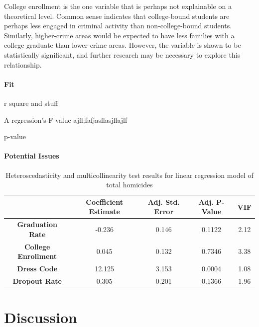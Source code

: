 \documentclass[12pt]{article}
\begin{document}
	\par
	
	College enrollment is the one variable that is perhaps not explainable on a theoretical level.  Common sense indicates that college-bound students are perhaps less engaged in criminal activity than non-college-bound students.  Similarly, higher-crime areas would be expected to have less families with a college graduate than lower-crime areas.  However, the variable is shown to be statistically significant, and further research may be necessary to explore this relationship.
	
	\paragraph{Fit}
	
	r square and stuff
	
	\par
	
	A regression's F-value ajfl;fafjasflasjflajlf
	
	\par
	
	p-value
	
	\paragraph{Potential Issues}

	\begin{center}
	\begin{table}[h]
		\begin{tabular}{ c | c | c | c | c }
			
			& \textbf{Coefficient Estimate} & \textbf{Adj. Std. Error} & \textbf{Adj. P-Value} & \textbf{VIF} \\
			\hline
			\textbf{Graduation Rate} & -0.236 & 0.146 & 0.1122 & 2.12  \\
			\textbf{College Enrollment} & 0.045 & 0.132 & 0.7346 & 3.38 \\
			\textbf{Dress Code} & 12.125 & 3.153 & 0.0004 & 1.08 \\
			\textbf{Dropout Rate} & 0.305 & 0.201 & 0.1366 & 1.96
			
		\end{tabular}
		\caption{Heteroscedasticity and multicollinearity test results for linear regression model of total homicides}
	\end{table}
\end{center}

	\section{Discussion}
\end{document}
